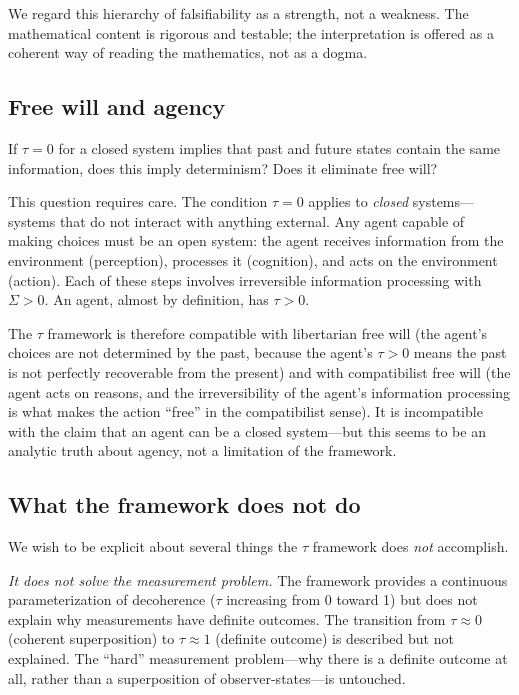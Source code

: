 \documentclass[12pt]{article}
\theoremstyle{definition}
\theoremstyle{remark}
\newcommand{\tauasym}{\tau}
\begin{document}
We regard this hierarchy of falsifiability as a strength, not a
weakness.  The mathematical content is rigorous and testable;
the interpretation is offered as a coherent way of reading the
mathematics, not as a dogma.

\subsection{Free will and agency}

If $\tauasym = 0$ for a closed system implies that past and future
states contain the same information, does this imply determinism?
Does it eliminate free will?

This question requires care.  The condition $\tauasym = 0$ applies
to \emph{closed} systems---systems that do not interact with
anything external.  Any agent capable of making choices must be
an open system: the agent receives information from the environment
(perception), processes it (cognition), and acts on the
environment (action).  Each of these steps involves irreversible
information processing with $\Sigma > 0$.
An agent, almost by definition, has $\tauasym > 0$.

The $\tauasym$ framework is therefore compatible with libertarian
free will (the agent's choices are not determined by the past,
because the agent's $\tauasym > 0$ means the past is not
perfectly recoverable from the present) and with compatibilist
free will (the agent acts on reasons, and the irreversibility of
the agent's information processing is what makes the action
``free'' in the compatibilist sense).  It is incompatible with
the claim that an agent can be a closed system---but this seems
to be an analytic truth about agency, not a limitation of the
framework.

\subsection{What the framework does not do}

We wish to be explicit about several things the $\tauasym$
framework does \emph{not} accomplish.

\emph{It does not solve the measurement problem.}
The framework provides a continuous parameterization of
decoherence ($\tauasym$ increasing from 0 toward 1) but does not
explain why measurements have definite outcomes.  The transition
from $\tauasym \approx 0$ (coherent superposition) to
$\tauasym \approx 1$ (definite outcome) is described but not
explained.  The ``hard'' measurement problem---why there is a
definite outcome at all, rather than a superposition of
observer-states---is untouched.
\end{document}
